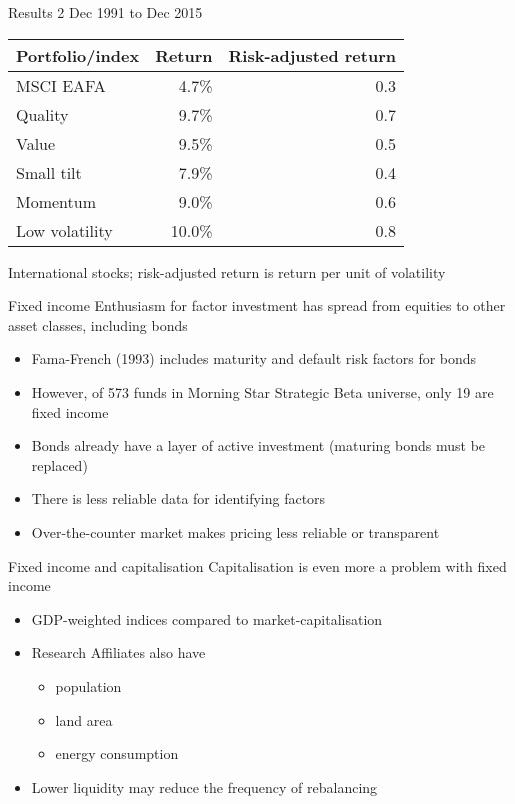 \documentclass[14pt,xcolor=pdftex,dvipsnames,table]{beamer}\usepackage[]{graphicx}\usepackage[]{color}
\begin{document}
\begin{frame}{Results 2}
Dec 1991 to Dec 2015
\begin{table}
\begin{center}
\begin{tabular}{l r r }
\textbf{Portfolio/index} & \textbf{Return} & \textbf{Risk-adjusted return} \\
\hline
MSCI EAFA        & 4.7\% &  0.3\\
Quality         & 9.7\% & 0.7\\
Value           & 9.5\% & 0.5\\
Small tilt      & 7.9\% & 0.4\\
Momentum        & 9.0\% & 0.6\\
Low volatility &  10.0\% & 0.8\\
\end{tabular}
\end{center}
\end{table}
International stocks; risk-adjusted return is return per unit of volatility
\end{frame}



\begin{frame}{Fixed income}
Enthusiasm for factor investment has spread from equities to other asset classes, including bonds
\begin{itemize}[<+-| alert@+>]
\pause
\item Fama-French (1993) includes maturity and default risk factors for bonds
\item However, of 573 funds in Morning Star Strategic Beta universe, only 19 are fixed income
\item Bonds already have a layer of active investment (maturing bonds must be replaced)
\item There is less reliable data for identifying factors
\item Over-the-counter market makes pricing less reliable or transparent
\end{itemize}
\end{frame}

\begin{frame}{Fixed income and capitalisation}
Capitalisation is even more a problem with fixed income
\begin{itemize}[<+-| alert@+>]
\pause
\item GDP-weighted indices compared to market-capitalisation
\item Research Affiliates also have
\begin{itemize}
\item population
\item land area
\item energy consumption
\end{itemize}
\item Lower liquidity may reduce the frequency of rebalancing 
\end{itemize}
\end{frame}
\end{document}
